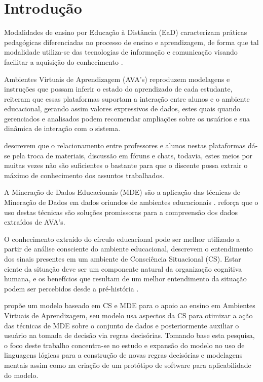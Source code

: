 \documentclass[
	oneside,
	12pt,				%
	a4paper,			%
	english,			%
	brazil,				%
	article
	]{abntex2}
\begin{document}
\section{Introdução}

Modalidades de ensino por Educação à Distância (EaD) caracterizam práticas pedagógicas diferenciadas no processo de ensino e aprendizagem, de forma que tal modalidade utiliza-se das tecnologias de informação e comunicação visando facilitar a aquisição do conhecimento \cite{Rabelo_et_al2017}.

Ambientes Virtuais de Aprendizagem (AVA’s) reproduzem modelagens e instruções que possam inferir o estado do aprendizado de cada estudante,  reiteram que essas plataformas suportam a interação entre alunos e o ambiente educacional, gerando assim valores expressivos de dados, estes quais quando gerenciados e analisados podem recomendar ampliações sobre os usuários e sua dinâmica de interação com o sistema.

 descrevem que o relacionamento entre professores e alunos nestas plataformas dá-se pela troca de materiais, discussão em fóruns e chats, todavia, estes meios por muitas vezes não são suficientes o bastante para que o discente possa extrair o máximo de conhecimento dos assuntos trabalhados.

A Mineração de Dados Educacionais (MDE) são a aplicação das técnicas de Mineração de Dados em dados oriundos de ambientes educacionais \cite{Romero_Ventura_2013}.  reforça que o uso destas técnicas são soluções promissoras para a compreensão dos dados extraídos de AVA's. 

O conhecimento extraído do círculo educacional pode ser melhor utilizado a partir de análise consciente do ambiente educacional,  descrevem o entendimento dos sinais presentes em um ambiente de Consciência Situacional (CS). Estar ciente da situação deve ser um componente natural da organização cognitiva humana, e os benefícios que resultam de um melhor entendimento da situação podem ser percebidos desde a pré-história \cite{Roy_Breton_Rousseau_2007}.

 propõe um modelo baseado em CS e MDE para o apoio ao ensino em Ambientes Virtuais de Aprendizagem, seu modelo usa aspectos da CS para otimizar a ação das técnicas de MDE sobre o conjunto de dados e posteriormente auxiliar o usuário na tomada de decisão via regras decisórias. Tomando base esta pesquisa, o foco deste trabalho concentra-se no estudo e expansão do modelo no uso de linguagens lógicas para a construção de novas regras decisórias e modelagens mentais assim como na criação de um protótipo de software para aplicabilidade do modelo.
\end{document}
